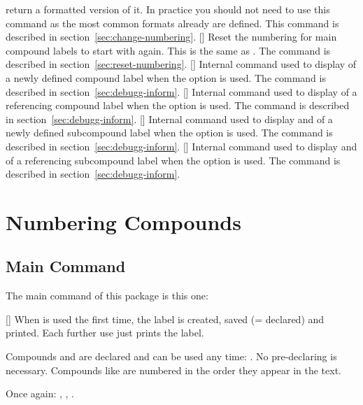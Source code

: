 \documentclass[load-preamble+,babel-options={ngerman,british,american}]{cnltx-doc}
\begin{document}
\begin{commands}
    return a formatted version of it.  In practice you should not need to use
    this command as the most common formats already are defined.  This command
    is described in section~\ref{sec:change-numbering}.
  []
    Reset the numbering for main compound labels to start with 
    again.  This is the same as
    .  The
    command is described in section~\ref{sec:reset-numbering}.
  []
    Internal command used to display  of a newly defined compound
    label when the option  is used.  The command is
    described in section~\ref{sec:debugg-inform}.
  []
    Internal command used to display  of a referencing compound
    label when the option  is used.  The command is
    described in section~\ref{sec:debugg-inform}.
  []
    Internal command used to display  and  of a newly defined subcompound label when the option
     is used.  The command is described in
    section~\ref{sec:debugg-inform}.
  []
    Internal command used to display  and  of a referencing subcompound label when the option
     is used.  The command is described in
    section~\ref{sec:debugg-inform}.
\end{commands}

\section{Numbering Compounds}\label{sec:numbering-compounds}
\subsection{Main Command}\label{sec:main-command}\resetcmpd

The main command of this package is this one:
\begin{commands}
  []
    When  is used the first time, the label is created, saved
    (= declared) and printed.  Each further use just prints the label.
\end{commands}

\begin{example}
  Compounds  and  are declared and can be used any time:
  .  No pre-declaring is necessary.  Compounds like  are
  numbered in the order they appear in the text.\par
  Once again: , , .
\end{example}
\end{document}
